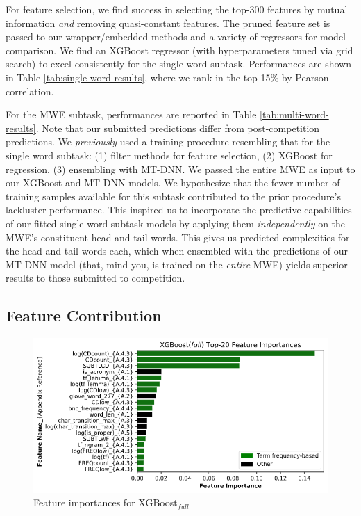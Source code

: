 \documentclass[11pt,a4paper]{article}
\begin{document}
\label{sec:performance}

For feature selection, we find success in selecting the top-300 features by mutual information \textit{and} removing quasi-constant features. The pruned feature set is passed to our wrapper/embedded methods and a variety of regressors for model comparison. We find an XGBoost regressor (with hyperparameters tuned via grid search) to excel consistently for the single word subtask. Performances are shown in Table \ref{tab:single-word-results}, where we rank in the top 15\% by Pearson correlation. 

For the MWE subtask, performances are reported in Table \ref{tab:multi-word-results}. Note that our submitted predictions differ from post-competition predictions. We \textit{previously} used a training procedure resembling that for the single word subtask: (1) filter methods for feature selection, (2) XGBoost for regression, (3) ensembling with MT-DNN. We passed the entire MWE as input to our XGBoost and MT-DNN models. We hypothesize that the fewer number of training samples available for this subtask contributed to the prior procedure's lackluster performance. This inspired us to incorporate the predictive capabilities of our fitted single word subtask models by applying them \textit{independently} on the MWE's constituent head and tail words. This gives us predicted complexities for the head and tail words each, which when ensembled with the predictions of our MT-DNN model (that, mind you, is trained on the \textit{entire} MWE) yields superior results to those submitted to competition.

\subsection{Feature Contribution}

\begin{figure}
  \centering
  \includegraphics[scale=0.3]{xgboost_feature_importances.png}
  \captionsetup{justification=centering}
  \caption{\label{fig:xgboost_feature_importance} Feature importances for XGBoost$_\textit{full}$}
\end{figure}
\end{document}
